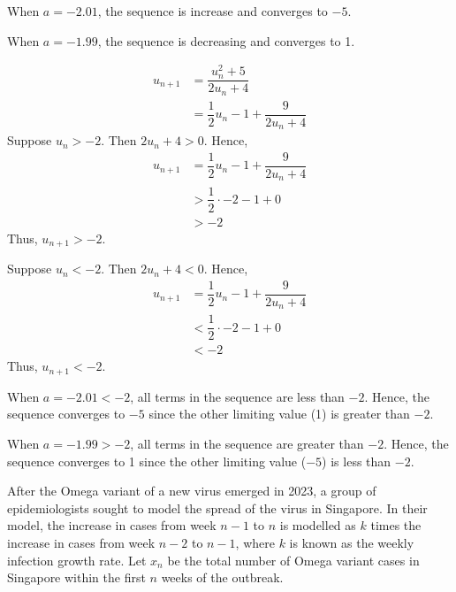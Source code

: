 \documentclass{echw}
\begin{document}
            \subpart

                 When $a = -2.01$, the sequence is increase and converges to $-5$. 
                
                 When $a = -1.99$, the sequence is decreasing and converges to 1.

            \subpart
                \begin{align*}
                    u_{n+1} &= \dfrac{u_n^2 + 5}{2u_n + 4}\\
                    &= \dfrac12 u_n - 1 + \dfrac9{2u_n + 4}
                \end{align*}
                Suppose $u_n > -2$. Then $2u_n + 4 > 0$. Hence,
                \begin{align*}
                    u_{n+1} &= \dfrac12 u_n - 1 + \dfrac9{2u_n + 4}\\
                    &> \dfrac12 \cdot -2 - 1 + 0\\
                    &> -2
                \end{align*}
                Thus, $u_{n+1} > -2$.

                \medskip

                 Suppose $u_n < -2$. Then $2u_n + 4 < 0$. Hence,
                \begin{align*}
                    u_{n+1} &= \dfrac12 u_n - 1 + \dfrac9{2u_n + 4}\\
                    &< \dfrac12 \cdot -2 - 1 + 0\\
                    &< -2
                \end{align*}
                Thus, $u_{n+1} < -2$.

                \medskip

                 When $a = -2.01 < -2$, all terms in the sequence are less than $-2$. Hence, the sequence converges to $-5$ since the other limiting value (1) is greater than $-2$.

                 When $a = -1.99 > -2$, all terms in the sequence are greater than $-2$. Hence, the sequence converges to 1 since the other limiting value ($-5$) is less than $-2$.

    \problem{}
        After the Omega variant of a new virus emerged in 2023, a group of epidemiologists sought to model the spread of the virus in Singapore. In their model, the increase in cases from week $n-1$ to $n$ is modelled as $k$ times the increase in cases from week $n-2$ to $n-1$, where $k$ is known as the weekly infection growth rate. Let $x_n$ be the total number of Omega variant cases in Singapore within the first $n$ weeks of the outbreak.
\end{document}
